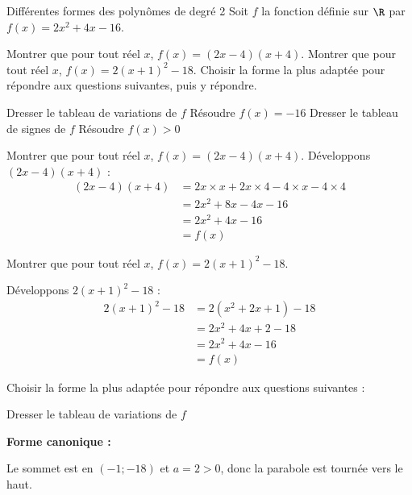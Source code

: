 \begin{EXO}{Différentes formes des polynômes de degré 2}{}%
Soit $f$ la fonction définie sur $\R$ par $ f(x) = 2x^2+4x-16$.

\begin{tcbenumerate}
\tcbitem {}Montrer que pour tout réel $x$, $f(x) = (2x-4)(x+4)$.
\tcbitem {}Montrer que pour tout réel $x$, $f(x) = 2(x+1)^2-18$.
\tcbitem[boxrule=0.4pt,colframe=black] Choisir la forme la plus adaptée pour répondre aux questions suivantes, puis y répondre.
\begin{tcbenumerate}[2][1][alph]
\tcbitem {}Dresser le tableau de variations de $f$
\tcbitem {}Résoudre $f(x)=-16$
\tcbitem {}Dresser le tableau de signes de $f$
\tcbitem {}Résoudre $f(x)>0$
\end{tcbenumerate}
\end{tcbenumerate}

\exocorrection

\begin{tcbenumerate}[2]
\tcbitem Montrer que pour tout réel $x$, $f(x) = (2x-4)(x+4)$.
Développons $(2x-4)(x+4)$ :
\begin{align*}
(2x-4)(x+4) &= 2x \times x + 2x \times 4 - 4 \times x - 4 \times 4\\
&= 2x^2 + 8x - 4x - 16\\
&= 2x^2 + 4x - 16\\
&= f(x)
\end{align*}

\tcbitem Montrer que pour tout réel $x$, $f(x) = 2(x+1)^2-18$.

Développons $2(x+1)^2-18$ :
\begin{align*}
2(x+1)^2-18 &= 2(x^2 + 2x + 1) - 18\\
&= 2x^2 + 4x + 2 - 18\\
&= 2x^2 + 4x - 16\\
&= f(x)
\end{align*}

\tcbitem[raster multicolumn=2] Choisir la forme la plus adaptée pour répondre aux questions suivantes :

\begin{tcbenumerate}[3][1][alph]
\tcbitem[raster multicolumn=3] Dresser le tableau de variations de $f$

\begin{MultiColonnes}{3}
    \tcbitem \textbf{Forme canonique :} 
    
Le sommet est en $(-1; -18)$ et $a = 2 > 0$, donc la parabole est tournée vers le haut.
    \tcbitem[halign=center,valign=center,raster multicolumn=2] 
\end{MultiColonnes}


\end{tcbenumerate}
\end{tcbenumerate}
\end{EXO}
